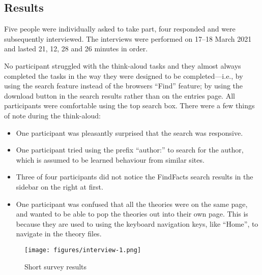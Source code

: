 \documentclass[bsc,frontabs,oneside,singlespacing,parskip,deptreport,logo]{infthesis}
\begin{document}
\subsection{Results} \label{redesign-eval-results}
Five people were individually asked to take part, four responded and were subsequently interviewed. The interviews were performed on 17--18 March 2021 and lasted 21, 12, 28 and 26 minutes in order.

No participant struggled with the think-aloud tasks and they almost always completed the tasks in the way they were designed to be completed---i.e., by using the search feature instead of the browsers ``Find'' feature; by using the download button in the search results rather than on the entries page. All participants were comfortable using the top search box. There were a few things of note during the think-aloud:

\begin{itemize}
    \item One participant was pleasantly surprised that the search was responsive.
    \item One participant tried using the prefix ``author:'' to search for the author, which is assumed to be learned behaviour from similar sites.
    \item Three of four participants did not notice the FindFacts search results in the sidebar on the right at first. %
    \item One participant was confused that all the theories were on the same page, and wanted to be able to pop the theories out into their own page. This is because they are used to using the keyboard navigation keys, like ``Home'', to navigate in the theory files.
\end{itemize}

\begin{figure}[h]
    \centering
    \texttt{[image: figures/interview-1.png]}
    \caption{Short survey results}
    \label{interview-results}
\end{figure}
\end{document}
